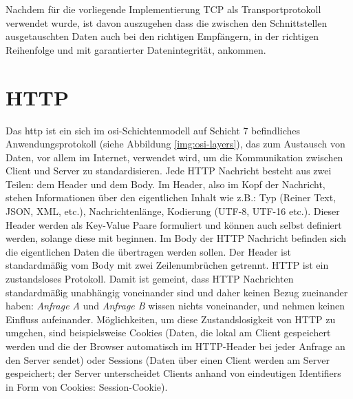 \noindent
Nachdem für die vorliegende Implementierung TCP als Transportprotokoll verwendet wurde, ist davon auszugehen dass die zwischen den Schnittstellen ausgetauschten Daten auch bei den richtigen Empfängern, in der richtigen Reihenfolge und mit garantierter Datenintegrität, ankommen.   

\newpage
\section{HTTP}\label{sec:theory:http}
Das \acrlong{http} ist ein sich im \acrshort{osi}-Schichtenmodell auf Schicht 7 befindliches Anwendungsprotokoll (siehe Abbildung \ref{img:osi-layers}), das zum Austausch von Daten, vor allem im Internet, verwendet wird, um die Kommunikation zwischen Client und Server zu standardisieren. Jede HTTP Nachricht besteht aus zwei Teilen: dem Header und dem Body. Im Header, also im Kopf der Nachricht, stehen Informationen über den eigentlichen Inhalt wie z.B.: Typ (Reiner Text, JSON, XML, etc.), Nachrichtenlänge, Kodierung (UTF-8, UTF-16 etc.). Dieser Header werden als Key-Value Paare formuliert und können auch selbst definiert werden, solange diese mit \frqq{}\flqq{} beginnen. Im Body der HTTP Nachricht befinden sich die eigentlichen Daten die übertragen werden sollen. Der Header ist standardmäßig vom Body mit zwei Zeilenumbrüchen \frqq{}\flqq{} getrennt. HTTP ist ein zustandsloses Protokoll. Damit ist gemeint, dass HTTP Nachrichten standardmäßig unabhängig voneinander sind und daher keinen Bezug zueinander haben: \textit{Anfrage A} und \textit{Anfrage B} wissen nichts voneinander, und nehmen keinen Einfluss aufeinander. Möglichkeiten, um diese Zustandslosigkeit von HTTP zu umgehen, sind beispielsweise Cookies (Daten, die lokal am Client gespeichert werden und die der Browser automatisch im HTTP-Header bei jeder Anfrage an den Server sendet) oder Sessions (Daten über einen Client werden am Server gespeichert; der Server unterscheidet Clients anhand von eindeutigen Identifiers in Form von Cookies: Session-Cookie).

